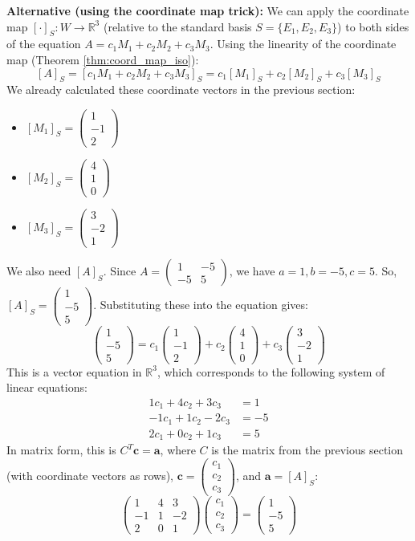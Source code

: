 \documentclass[11pt]{article}
\theoremstyle{definition}
\theoremstyle{remark}
\newcommand{\R}{\mathbb{R}}
\newcommand{\mat}[1]{\begin{pmatrix}#1\end{pmatrix}}
\begin{document}
\begin{itemize}
        \textbf{Alternative (using the coordinate map trick):}
        We can apply the coordinate map $[\cdot]_S: W \to \R^3$ (relative to the standard basis $S=\{E_1, E_2, E_3\}$) to both sides of the equation $A = c_1 M_1 + c_2 M_2 + c_3 M_3$. Using the linearity of the coordinate map (Theorem \ref{thm:coord_map_iso}):
        \[ [A]_S = [c_1 M_1 + c_2 M_2 + c_3 M_3]_S = c_1 [M_1]_S + c_2 [M_2]_S + c_3 [M_3]_S \]
        We already calculated these coordinate vectors in the previous section:
        \begin{itemize}
            \item $[M_1]_S = \mat{1 \\ -1 \\ 2}$
            \item $[M_2]_S = \mat{4 \\ 1 \\ 0}$
            \item $[M_3]_S = \mat{3 \\ -2 \\ 1}$
        \end{itemize}
        We also need $[A]_S$. Since $A = \mat{1 & -5 \\ -5 & 5}$, we have $a=1, b=-5, c=5$. So, $[A]_S = \mat{1 \\ -5 \\ 5}$.
        Substituting these into the equation gives:
        \[ \mat{1 \\ -5 \\ 5} = c_1 \mat{1 \\ -1 \\ 2} + c_2 \mat{4 \\ 1 \\ 0} + c_3 \mat{3 \\ -2 \\ 1} \]
        This is a vector equation in $\R^3$, which corresponds to the following system of linear equations:
        \begin{align*} 1c_1 + 4c_2 + 3c_3 &= 1 \\ -1c_1 + 1c_2 - 2c_3 &= -5 \\ 2c_1 + 0c_2 + 1c_3 &= 5 \end{align*}
        In matrix form, this is $C^T \mathbf{c} = \mathbf{a}$, where $C$ is the matrix from the previous section (with coordinate vectors as rows), $\mathbf{c} = \mat{c_1 \\ c_2 \\ c_3}$, and $\mathbf{a} = [A]_S$:
        \[ \mat{1 & 4 & 3 \\ -1 & 1 & -2 \\ 2 & 0 & 1} \mat{c_1 \\ c_2 \\ c_3} = \mat{1 \\ -5 \\ 5} \]

\end{itemize}
\end{document}

